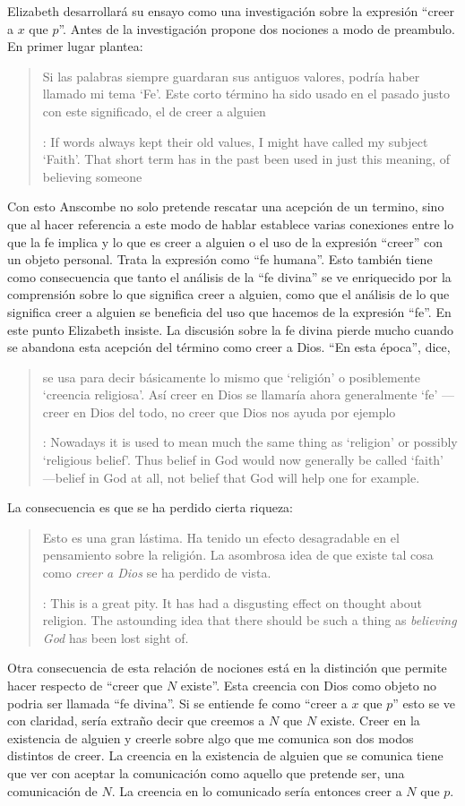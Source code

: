 Elizabeth desarrollará su ensayo como una investigación sobre la expresión \enquote{creer a $x$ que $p$}. Antes de la investigación propone dos nociones a modo de preambulo. En primer lugar plantea: \blockquote[{\cite{anscombe2008faith:tobelieve}}: If words always kept their old values, I might have called my subject `Faith'. That short term has in the past been used in just this meaning, of believing someone]{Si las palabras siempre guardaran sus antiguos valores, podría haber llamado mi tema `Fe'. Este corto término ha sido usado en el pasado justo con este significado, el de creer a alguien}. Con esto Anscombe no solo pretende rescatar una acepción de un termino, sino que al hacer referencia a este modo de hablar establece varias conexiones entre lo que la fe implica y lo que es creer a alguien o el uso de la expresión \enquote{creer} con un objeto personal. Trata la expresión como \enquote{fe humana}. Esto también tiene como consecuencia que tanto el análisis de la \enquote{fe divina} se ve enriquecido por la comprensión sobre lo que significa creer a alguien, como que el análisis de lo que significa creer a alguien se beneficia del uso que hacemos de la expresión \enquote{fe}. En este punto Elizabeth insiste. La discusión sobre la fe divina pierde mucho cuando se abandona esta acepción del término como creer a Dios. \enquote{En esta época}, dice, \blockquote[{\cite{anscombe2008faith:tobelieve}}: Nowadays it is used to mean much the same thing as `religion' or possibly `religious belief'. Thus belief in God would now generally be called `faith' ---belief in God at all, not belief that God will help one for example.]{se usa para decir básicamente lo mismo que `religión' o posiblemente `creencia religiosa'. Así creer en Dios se llamaría ahora generalmente `fe' ---creer en Dios del todo, no creer que Dios nos ayuda por ejemplo}. La consecuencia es que se ha perdido cierta riqueza: \blockquote[{\cite{anscombe2008faith:tobelieve}}: This is a great pity. It has had a disgusting effect on thought about religion. The astounding idea that there should be such a thing as \emph{believing God} has been lost sight of.]{Esto es una gran lástima. Ha tenido un efecto desagradable en el pensamiento sobre la religión. La asombrosa idea de que existe tal cosa como \emph{creer a Dios} se ha perdido de vista.}

Otra consecuencia de esta relación de nociones está en la distinción que permite hacer respecto de \enquote{creer que $N$ existe}. Esta creencia con Dios como objeto no podria ser llamada \enquote{fe divina}. Si se entiende fe como \enquote{creer a $x$ que $p$} esto se ve con claridad, sería extraño decir que creemos a $N$ que $N$ existe. Creer en la existencia de alguien y creerle sobre algo que me comunica son dos modos distintos de creer. La creencia en la existencia de alguien que se comunica tiene que ver con aceptar la comunicación como aquello que pretende ser, una comunicación de $N$. La creencia en lo comunicado sería entonces creer a $N$ que $p$.

